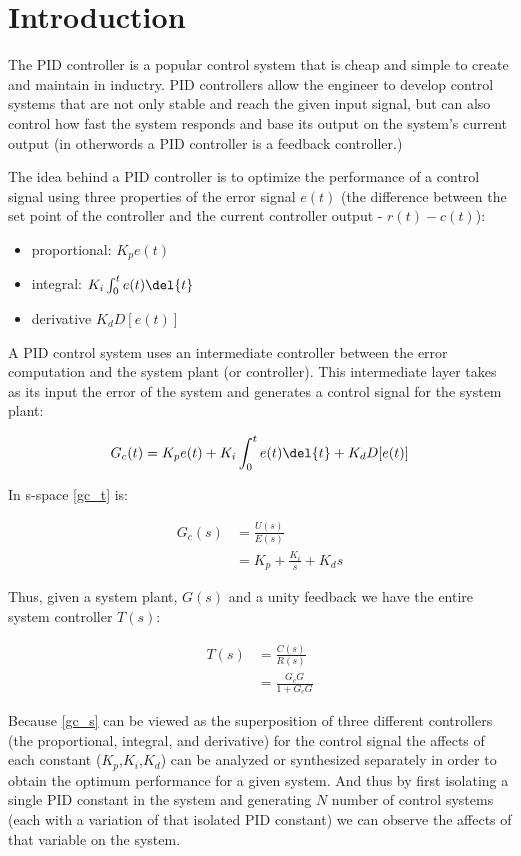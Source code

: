 \documentclass[main.tex]{subfile}
\begin{document}
\section{Introduction} 
\label{sec:introduction}

The PID controller is a popular control system that is cheap and simple to
create and maintain in inductry. PID controllers allow the engineer to develop
control systems that are not only stable and reach the given input signal, but
can also control how fast the system responds and base its output on the
system's current output (in otherwords a PID controller is a feedback controller.)

The idea behind a PID controller is to optimize the performance of a control
signal using three properties of the error signal $e(t)$ (the difference between the
set point of the controller and the current controller output - $r(t)-c(t)$): 

\begin{itemize}
	\item proportional: $K_p e(t)$
	\item integral: $K_i \int_0^t e(t) \del{t}$
	\item derivative $K_d D[e(t)]$
\end{itemize}

A PID control system uses an intermediate controller between the error
computation and the system plant (or controller). This intermediate layer takes
as its input the error of the system and generates a control signal for the
system plant:

\begin{align}
	\label{eq:gc_t}
	G_c(t) = K_p e(t) + K_i \int_0^t e(t) \del{t} + K_d D[e(t)]
\end{align}

In s-space \eqref{gc_t} is: 

\begin{align}
	\label{eq:gc_s}
	G_c(s) &= \frac{U(s)}{E(s)}
	\\     &= K_p + \frac{K_i}{s} + K_ds
\end{align}

Thus, given a system plant, $G(s)$ and a unity feedback we have the entire
system controller $T(s)$: 

\begin{align}
	T(s) &= \frac{C(s)}{R(s)}
	\\   &= \frac{G_cG}{1+G_cG}
\end{align}


Because \eqref{gc_s} can be viewed as the superposition of three different
controllers (the proportional, integral, and derivative) for the control signal
the affects of each constant ($K_p$,$K_i$,$K_d$) can be analyzed or synthesized
separately in order to obtain the optimum performance for a given system. And
thus by first isolating a single PID constant in the system and generating $N$
number of control systems (each with a variation of that isolated PID constant)
we can observe the affects of that variable on the system.

\end{document}
